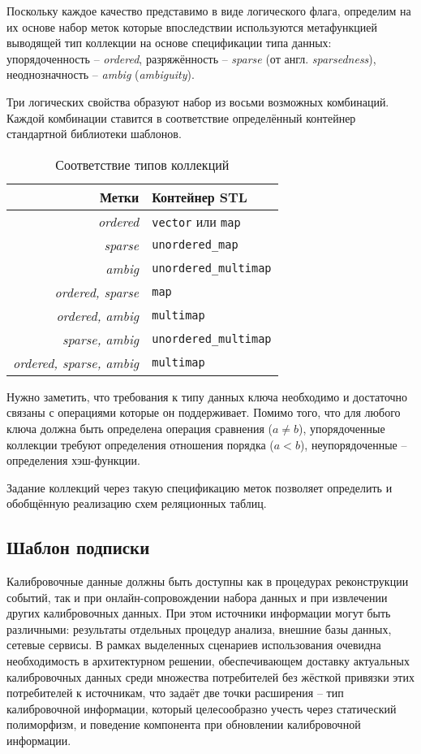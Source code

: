 Поскольку каждое качество представимо в виде логического флага, определим
на их основе набор меток которые впоследствии используются
метафункцией выводящей тип коллекции на основе спецификации типа данных:
упорядоченность -- \emph{ordered}, разряжённость -- \emph{sparse} (от
англ. \emph{sparsedness}), неоднозначность -- \emph{ambig} (\emph{ambiguity}).

Три логических свойства образуют набор из восьми возможных комбинаций. Каждой
комбинации ставится в соответствие определённый контейнер стандартной
библиотеки шаблонов.

\begin{table}[ht]
    \centering
    \begin{tabular}{r|l}
        Метки & Контейнер STL \\ \hline
        \emph{ordered} & \texttt{vector} или \texttt{map} \\
        \emph{sparse} & \texttt{unordered\_map} \\
        \emph{ambig} & \texttt{unordered\_multimap} \\
        \emph{ordered, sparse} & \texttt{map} \\
        \emph{ordered, ambig}  & \texttt{multimap} \\
        \emph{sparse, ambig} & \texttt{unordered\_multimap} \\
        \emph{ordered, sparse, ambig} & \texttt{multimap}
    \end{tabular}
    \caption{Соответствие типов коллекций}
    \label{tab:placeholder}
\end{table}

Нужно заметить, что требования к типу данных ключа необходимо и достаточно
связаны с операциями которые он поддерживает. Помимо того, что
для любого ключа должна быть определена операция
сравнения ($a \ne b$), упорядоченные коллекции требуют
определения отношения порядка ($a < b$), неупорядоченные --
определения хэш-функции.

Задание коллекций через такую спецификацию меток позволяет
определить и обобщённую реализацию схем реляционных
таблиц.

\subsection{Шаблон подписки}

Калибровочные данные должны быть доступны как в процедурах
реконструкции событий, так и при онлайн-сопровождении
набора данных и при извлечении других калибровочных данных.
При этом источники информации могут быть различными:
результаты отдельных процедур анализа, внешние базы
данных, сетевые сервисы. В рамках выделенных сценариев
использования очевидна необходимость в архитектурном решении,
обеспечивающем доставку актуальных калибровочных данных
среди множества потребителей без жёсткой привязки этих
потребителей к источникам, что задаёт две точки
расширения -- тип калибровочной информации, который
целесообразно учесть через статический полиморфизм,
и поведение компонента при обновлении калибровочной информации.


